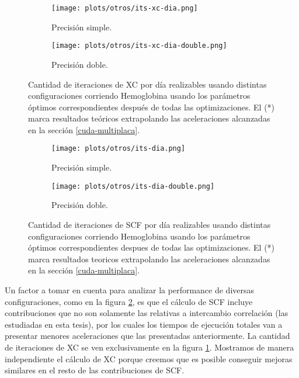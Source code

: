 \begin{figure}[htbp]
\centering
  \begin{subfigure}[b]{\plotwidthtres}
    \texttt{[image: plots/otros/its-xc-dia.png]}
    \caption{Precisi\'on simple.}
  \end{subfigure}
  \begin{subfigure}[b]{\plotwidthtres}
    \texttt{[image: plots/otros/its-xc-dia-double.png]}
    \caption{Precisi\'on doble.}
  \end{subfigure}
  \caption{Cantidad de iteraciones de XC por d\'ia realizables usando distintas configuraciones corriendo Hemoglobina usando los
            par\'ametros \'optimos correspondientes despu\'es de todas las optimizaciones. El (*) marca resultados te\'oricos extrapolando
            las aceleraciones alcanzadas en la secci\'on \ref{cuda-multiplaca}.}
  \label{fig:its-xc-dia}
\end{figure}


\begin{figure}[htbp]
\centering
  \begin{subfigure}[b]{\plotwidthtres}
    \texttt{[image: plots/otros/its-dia.png]}
    \caption{Precisi\'on simple.}
  \end{subfigure}
  \begin{subfigure}[b]{\plotwidthtres}
    \texttt{[image: plots/otros/its-dia-double.png]}
    \caption{Precisi\'on doble.}
  \end{subfigure}
    \caption{Cantidad de iteraciones de SCF por d\'ia realizables usando distintas configuraciones corriendo Hemoglobina usando los
              par\'ametros \'optimos correspondientes despues de todas las optimizaciones. El (*) marca resultados teoricos extrapolando
              las aceleraciones alcanzadas en la secci\'on \ref{cuda-multiplaca}.}
    \label{fig:its-dia}
\end{figure}

Un factor a tomar en cuenta para analizar la performance de diversas configuraciones, como en la figura \ref{fig:its-dia},
es que el c\'alculo de SCF incluye contribuciones que no son solamente las relativas a intercambio correlaci\'on
(las estudiadas en esta tesis), por los cuales los tiempos de ejecuci\'on totales van
a presentar menores aceleraciones que las presentadas anteriormente. La cantidad de iteraciones de XC se ven
exclusivamente en la figura \ref{fig:its-xc-dia}. Mostramos de manera independiente el c\'alculo de XC porque
creemos que es posible conseguir mejoras similares en el resto de las contribuciones de SCF.

